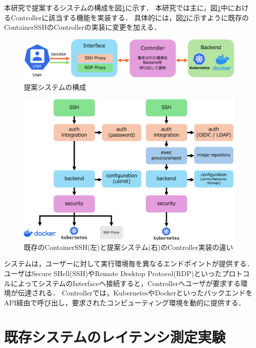 \documentclass[dvipdfmx]{cs-handout}
\begin{document}
本研究で提案するシステムの構成を図\ref{fig:system}に示す．
本研究では主に，図\ref{fig:system}中におけるControllerに該当する機能を実装する．
具体的には，図\ref{fig:diff}に示すように既存のContainerSSHのControllerの実装に変更を加える．
%
\begin{figure}[htbp]
\includegraphics[width=\linewidth]{./fig/simple.png}
\caption{提案システムの構成}
\label{fig:system}
\end{figure}
%
\begin{figure}[tb]
\includegraphics[width=\linewidth]{./fig/diff.png}
\caption{既存のContainerSSH(左)と提案システム(右)のController実装の違い}
\label{fig:diff}
\end{figure}
%
システムは，ユーザーに対して実行環境毎を異なるエンドポイントが提供する．
ユーザはSecure SHell(SSH)やRemote Desktop Protocol(RDP)といったプロトコルによってシステムのInterfaceへ接続すると，Controllerへユーザが要求する環境が伝達される．
Controllerでは，KubernetesやDockerといったバックエンドをAPI経由で呼び出し，要求されたコンピューティング環境を動的に提供する．

\section{既存システムのレイテンシ測定実験}
\end{document}

